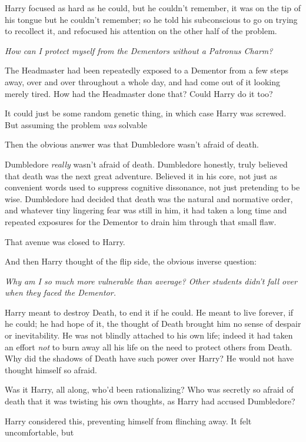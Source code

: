 Harry focused as hard as he could, but he couldn't remember, it was on the tip
of his tongue but he couldn't remember; so he told his subconscious to go on
trying to recollect it, and refocused his attention on the other half of the
problem.

\emph{How can I protect myself from the Dementors without a Patronus Charm?}

The Headmaster had been repeatedly exposed to a Dementor from a few steps away,
over and over throughout a whole day, and had come out of it looking merely
tired. How had the Headmaster done that? Could Harry do it too?

It could just be some random genetic thing, in which case Harry was screwed.
But assuming the problem \emph{was} solvable{\el}

Then the obvious answer was that Dumbledore wasn't afraid of death.

Dumbledore \emph{really} wasn't afraid of death. Dumbledore honestly, truly
believed that death was the next great adventure. Believed it in his core, not
just as convenient words used to suppress cognitive dissonance, not just
pretending to be wise. Dumbledore had decided that death was the natural and
normative order, and whatever tiny lingering fear was still in him, it had
taken a long time and repeated exposures for the Dementor to drain him through
that small flaw.

That avenue was closed to Harry.

And then Harry thought of the flip side, the obvious inverse question:

\emph{Why am I so much more vulnerable than average? Other students didn't fall
over when they faced the Dementor.}

Harry meant to destroy Death, to end it if he could. He meant to live forever,
if he could; he had hope of it, the thought of Death brought him no sense of
despair or inevitability. He was not blindly attached to his own life; indeed
it had taken an effort \emph{not} to burn away all his life on the need to
protect others from Death. Why did the shadows of Death have such power over
Harry? He would not have thought himself so afraid.

Was it Harry, all along, who'd been rationalizing? Who was secretly so afraid
of death that it was twisting his own thoughts, as Harry had accused Dumbledore?

Harry considered this, preventing himself from flinching away. It felt
uncomfortable, but{\el}

